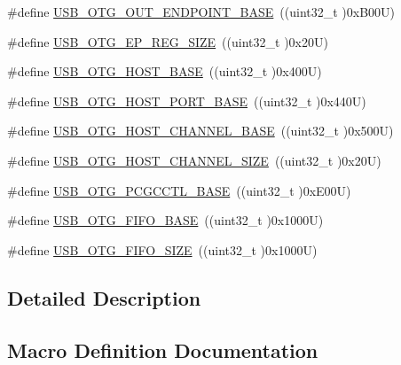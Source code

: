 \begin{DoxyCompactItemize}
\item 
\#define \hyperlink{group___peripheral__registers__structures_gaf0e972b8f028ecf44a652029efbd4642}{U\+S\+B\+\_\+\+O\+T\+G\+\_\+\+O\+U\+T\+\_\+\+E\+N\+D\+P\+O\+I\+N\+T\+\_\+\+B\+A\+SE}~((uint32\+\_\+t )0x\+B00\+U)
\item 
\#define \hyperlink{group___peripheral__registers__structures_ga6fdb7429ad88e2d69440d6ecc4f4199e}{U\+S\+B\+\_\+\+O\+T\+G\+\_\+\+E\+P\+\_\+\+R\+E\+G\+\_\+\+S\+I\+ZE}~((uint32\+\_\+t )0x20\+U)
\item 
\#define \hyperlink{group___peripheral__registers__structures_ga3bb2dd6c82eefd8587b6146ba36ae071}{U\+S\+B\+\_\+\+O\+T\+G\+\_\+\+H\+O\+S\+T\+\_\+\+B\+A\+SE}~((uint32\+\_\+t )0x400\+U)
\item 
\#define \hyperlink{group___peripheral__registers__structures_ga42f433cb79ca69f09972e690fda6737a}{U\+S\+B\+\_\+\+O\+T\+G\+\_\+\+H\+O\+S\+T\+\_\+\+P\+O\+R\+T\+\_\+\+B\+A\+SE}~((uint32\+\_\+t )0x440\+U)
\item 
\#define \hyperlink{group___peripheral__registers__structures_ga942c8c5241b80fbcf638fea0fa18bebd}{U\+S\+B\+\_\+\+O\+T\+G\+\_\+\+H\+O\+S\+T\+\_\+\+C\+H\+A\+N\+N\+E\+L\+\_\+\+B\+A\+SE}~((uint32\+\_\+t )0x500\+U)
\item 
\#define \hyperlink{group___peripheral__registers__structures_ga266cb1dbb50faf447f9c15d2ee93a522}{U\+S\+B\+\_\+\+O\+T\+G\+\_\+\+H\+O\+S\+T\+\_\+\+C\+H\+A\+N\+N\+E\+L\+\_\+\+S\+I\+ZE}~((uint32\+\_\+t )0x20\+U)
\item 
\#define \hyperlink{group___peripheral__registers__structures_gaa9766975aca084c257730879568bc7cf}{U\+S\+B\+\_\+\+O\+T\+G\+\_\+\+P\+C\+G\+C\+C\+T\+L\+\_\+\+B\+A\+SE}~((uint32\+\_\+t )0x\+E00\+U)
\item 
\#define \hyperlink{group___peripheral__registers__structures_gace340350802904868673f0e839c4fa04}{U\+S\+B\+\_\+\+O\+T\+G\+\_\+\+F\+I\+F\+O\+\_\+\+B\+A\+SE}~((uint32\+\_\+t )0x1000\+U)
\item 
\#define \hyperlink{group___peripheral__registers__structures_ga8781c4b2406c740d9fe540737a6a0188}{U\+S\+B\+\_\+\+O\+T\+G\+\_\+\+F\+I\+F\+O\+\_\+\+S\+I\+ZE}~((uint32\+\_\+t )0x1000\+U)
\end{DoxyCompactItemize}


\subsection{Detailed Description}


\subsection{Macro Definition Documentation}
